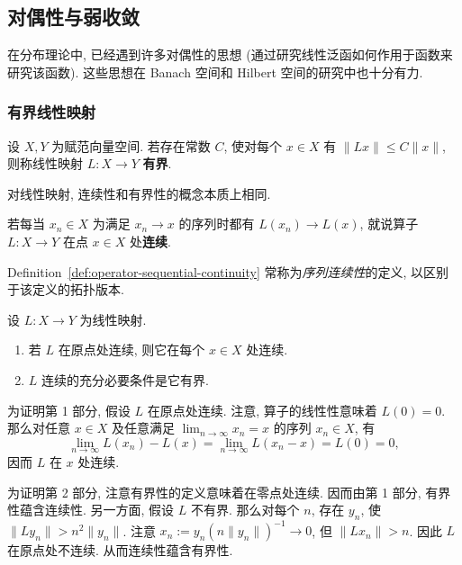 \subsection{对偶性与弱收敛}\label{sec:duality-weak-convergence}

在分布理论中, 已经遇到许多对偶性的思想 (通过研究线性泛函如何作用于函数来研究该函数). 这些思想在 Banach 空间和 Hilbert 空间的研究中也十分有力.

\subsubsection{有界线性映射}\label{subsec:bounded-linear-mappings}

\begin{Definition}
\label{def:bounded-linear-mapping}
设 $X,Y$ 为赋范向量空间. 若存在常数 $C$, 使对每个 $x\in X$ 有 $\|Lx\|\leq C\|x\|$, 则称线性映射 $L:X\to Y$ \textbf{有界}.
\end{Definition}

对线性映射, 连续性和有界性的概念本质上相同.

\begin{Definition}
\label{def:operator-sequential-continuity}
若每当 $x_n\in X$ 为满足 $x_n\to x$ 的序列时都有 $L(x_n)\to L(x)$, 就说算子 $L:X\to Y$ 在点 $x\in X$ 处\textbf{连续}.
\end{Definition}

\begin{Remark}
\label{rem:sequential-versus-topological-continuity}
Definition~\ref{def:operator-sequential-continuity} 常称为\emph{序列连续性}的定义, 以区别于该定义的拓扑版本.
\end{Remark}

\begin{Lemma}
\label{lem:linear-mapping-bounded-continuity-equivalence}
设 $L:X\to Y$ 为线性映射.\begin{enumerate}
\item 若 $L$ 在原点处连续, 则它在每个 $x\in X$ 处连续.
\item $L$ 连续的充分必要条件是它有界.
\end{enumerate}
\end{Lemma}

\begin{Proof}
为证明第 1 部分, 假设 $L$ 在原点处连续. 注意, 算子的线性性意味着 $L(0)=0$. 那么对任意 $x\in X$ 及任意满足 $\lim_{n\to\infty}x_n=x$ 的序列 $x_n\in X$, 有
\begin{equation}\label{eq:linear-map-continuity-at-origin-translation}
\lim_{n\to\infty}L(x_n)-L(x)=\lim_{n\to\infty}L(x_n-x)=L(0)=0,
\end{equation}
因而 $L$ 在 $x$ 处连续.

为证明第 2 部分, 注意有界性的定义意味着在零点处连续. 因而由第 1 部分, 有界性蕴含连续性. 另一方面, 假设 $L$ 不有界. 那么对每个 $n$, 存在 $y_n$, 使 $\|Ly_n\|>n^2\|y_n\|$. 注意 $x_n:=y_n(n\|y_n\|)^{-1}\to0$, 但 $\|Lx_n\|>n$. 因此 $L$ 在原点处不连续. 从而连续性蕴含有界性.
\end{Proof}

